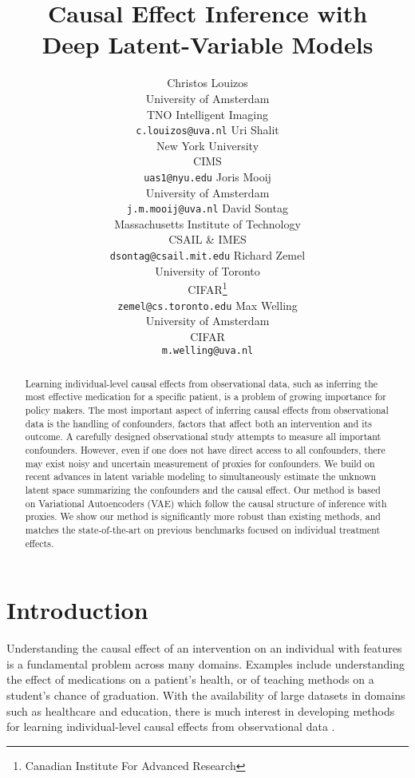 \documentclass{article}
\title{Causal Effect Inference with \\ Deep Latent-Variable Models}
\author{ Christos Louizos \\
University of Amsterdam\\
TNO Intelligent Imaging\\
\texttt{c.louizos@uva.nl}
\And
Uri Shalit  \\
New York University\\
CIMS\\
\texttt{uas1@nyu.edu}
\And
Joris Mooij   \\
University of Amsterdam\\
\texttt{j.m.mooij@uva.nl}
\AND 
David Sontag\\
Massachusetts Institute of Technology\\
CSAIL \& IMES\\
\texttt{dsontag@csail.mit.edu}
\And 
Richard Zemel\\
University of Toronto\\
CIFAR\thanks{Canadian Institute For Advanced Research}\\
\texttt{zemel@cs.toronto.edu}
\And 
Max Welling\\
University of Amsterdam\\
CIFAR\\
\texttt{m.welling@uva.nl}
}
\begin{document}
\maketitle

\begin{abstract}
Learning individual-level causal effects from observational data, such as inferring the most effective medication for a specific patient, is a problem of growing importance for policy makers. The most important aspect of inferring causal effects from observational data is the handling of confounders, factors that affect both an intervention and its outcome. A carefully designed observational study attempts to measure all important confounders. However, even if one does not have direct access to all confounders, there may exist noisy and uncertain measurement of proxies for confounders.
We build on recent advances in latent variable modeling to simultaneously estimate the unknown latent space summarizing the confounders and the causal effect. 
Our method is based on Variational Autoencoders (VAE) which follow the causal structure of inference with proxies. We show our method is significantly more robust than existing methods, and matches the state-of-the-art on previous benchmarks focused on individual treatment effects. 
\end{abstract}

\section{Introduction}
Understanding the causal effect of an intervention  on an individual with features  is a fundamental problem across many domains. Examples include understanding the effect of medications on a patient's health, or of teaching methods on a student's chance of graduation. With the availability of large datasets in domains such as healthcare and education, there is much interest in developing methods for learning individual-level causal effects from observational data \citep{pearl2015detecting,wager2015estimation,johansson2016learning,peysakhovich2016combining}. 
\end{document}
